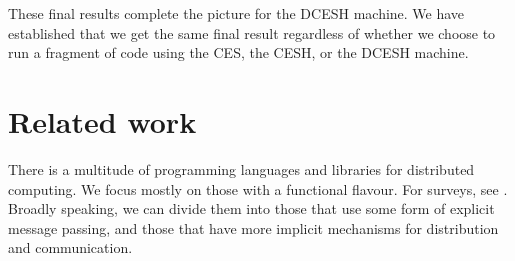 \documentclass{article}
\theoremstyle{definition}
\newcommand{\DCESHn}{DCESH}
\newcommand{\Varid}[1]{\mathit{#1}}
\def\resethooks{\global\let\SaveRestoreHook\empty
  \global\let\ColumnHook\empty}
\newlength{\blanklineskip}
\newcommand{\hsindent}[1]{\quad}\let\hspre\empty
\renewcommand\Varid[1]{\mathord{\textsf{#1}}}
\newcommand\MyConid[1]{\mathord{\textsf{\textbf{#1}}}}
\renewcommand\Varid[1]{\textsf{#1}}
\begin{document}
\begin{comment}
\>[5]{}\hsindent{17}{}\<[22]\>[22]{}(\Varid{sym}\;(\Varid{update-look}\;{}\<[E]\\
\>[22]{}\hsindent{8}{}\<[30]\>[30]{}(\Varid{λ}\;\Varid{i'}\;\Varid{→}\;(\MyConid{nothing},\Varid{∅},\Varid{∅}))\;{}\<[E]\\
\>[22]{}\hsindent{8}{}\<[30]\>[30]{}\Varid{root}\;{}\<[E]\\
\>[22]{}\hsindent{8}{}\<[30]\>[30]{}(\MyConid{just}\;(\Varid{code},[\mskip1.5mu \mskip1.5mu],[\mskip1.5mu \mskip1.5mu],\MyConid{nothing}),\Varid{∅},\Varid{∅})))\;{}\<[E]\\
\>[5]{}\hsindent{17}{}\<[22]\>[22]{}(\Varid{refl},(\Varid{λ}\;\Varid{n}\;\Varid{→}\;\Varid{tt}),\Varid{tt}){}\<[E]\\[\blanklineskip]\>[B]{}\Varid{initial-related}_{\Varid{Async}}\;\mathbin{:}\;\Varid{∀}\;\Varid{code}\;\Varid{root}\;\Varid{→}\;\Varid{R}_{\Varid{Async}}\;(\Varid{code},[\mskip1.5mu \mskip1.5mu],[\mskip1.5mu \mskip1.5mu],\Varid{∅})\;(\Varid{initial-network}_{\Varid{Async}}\;\Varid{code}\;\Varid{root}){}\<[E]\\
\>[B]{}\Varid{initial-related}_{\Varid{Async}}\;\Varid{code}\;\Varid{root}\;\mathrel{=}\;\Varid{initial-related}_{\Varid{Sync}}\;\Varid{code}\;\Varid{root}{}\<[E]\\[\blanklineskip]\>[B]{}\Varid{bisimilarity}\;\mathbin{:}\;\Varid{∀}\;\Varid{code}\;\Varid{root}\;\Varid{→}\;(\Varid{code},[\mskip1.5mu \mskip1.5mu],[\mskip1.5mu \mskip1.5mu],\Varid{∅})\;\mathord{\sim}\;\Varid{initial-network}_{\Varid{Sync}}\;\Varid{code}\;\Varid{root}{}\<[E]\\
\>[B]{}\Varid{bisimilarity}\;\Varid{code}\;\Varid{root}\;\mathrel{=}\;\Varid{R}_{\Varid{Sync}},\Varid{bisimulation}_{\Varid{Sync}},\Varid{initial-related}_{\Varid{Sync}}\;\Varid{code}\;\Varid{root}{}\<[E]\ColumnHook
\end{hscode}\resethooks
\end{comment}

These final results complete the picture for the \DCESHn{} machine. We
have established that we get the same final result regardless of
whether we choose to run a fragment of code using the CES, the CESH,
or the \DCESHn{} machine.

\section{Related work}

There is a multitude of programming languages and libraries for distributed
computing. We focus mostly on those with a functional flavour. For surveys, see
\cite{DBLP:journals/jfp/TrinderLP02, DBLP:journals/lisp/LoidlRSHHKLMPPPT03}.
Broadly speaking, we can divide them into those that use some form of explicit
message passing, and those that have more implicit mechanisms for distribution
and communication.
\end{document}
